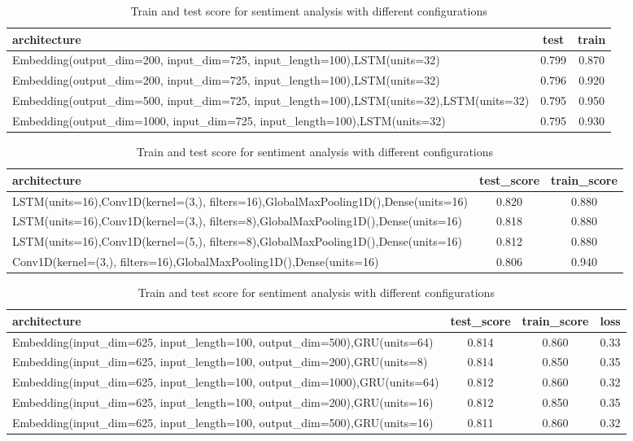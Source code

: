 \documentclass[10pt]{SelfArx} %
\begin{document}
	\begin{table}[]
		\begin{tabular*}{1\linewidth}{@{\extracolsep{\fill} }lcc@{}}
			\toprule
			architecture & test & train \\ \midrule
			Embedding(output\_dim=200, input\_dim=725, input\_length=100),LSTM(units=32) & 0.799 & 0.870 \\
			Embedding(output\_dim=200, input\_dim=725, input\_length=100),LSTM(units=32) & 0.796 & 0.920 \\
			Embedding(output\_dim=500, input\_dim=725, input\_length=100),LSTM(units=32),LSTM(units=32) & 0.795 & 0.950 \\
			Embedding(output\_dim=1000, input\_dim=725, input\_length=100),LSTM(units=32) & 0.795 & 0.930 \\ \bottomrule
		\end{tabular*}
		\caption{Train and test score for sentiment analysis with different configurations}
		\label{tsentiment2}
	\end{table}
	\begin{table}
		\begin{tabular*}{1\linewidth}{@{\extracolsep{\fill} }lcc@{}}
			\toprule
			architecture & test\_score & train\_score \\ \midrule
			LSTM(units=16),Conv1D(kernel=(3,), filters=16),GlobalMaxPooling1D(),Dense(units=16) & 0.820 & 0.880 \\
			LSTM(units=16),Conv1D(kernel=(3,), filters=8),GlobalMaxPooling1D(),Dense(units=16) & 0.818 & 0.880 \\
			LSTM(units=16),Conv1D(kernel=(5,), filters=8),GlobalMaxPooling1D(),Dense(units=16) & 0.812 & 0.880 \\
			Conv1D(kernel=(3,), filters=16),GlobalMaxPooling1D(),Dense(units=16) & 0.806 & 0.940 \\ \bottomrule
		\end{tabular*}
		\caption{Train and test score for sentiment analysis with different configurations}
		\label{tsentiment3}
	\end{table}
	\begin{table}[]
		\begin{tabular*}{1\linewidth}{@{\extracolsep{\fill} }lccc@{}}
			\toprule
			architecture & test\_score & train\_score & loss \\ \midrule
			Embedding(input\_dim=625, input\_length=100, output\_dim=500),GRU(units=64) & 0.814 & 0.860 & 0.33 \\
			Embedding(input\_dim=625, input\_length=100, output\_dim=200),GRU(units=8) & 0.814 & 0.850 & 0.35 \\
			Embedding(input\_dim=625, input\_length=100, output\_dim=1000),GRU(units=64) & 0.812 & 0.860 & 0.32 \\
			Embedding(input\_dim=625, input\_length=100, output\_dim=200),GRU(units=16) & 0.812 & 0.850 & 0.35 \\
			Embedding(input\_dim=625, input\_length=100, output\_dim=500),GRU(units=16) & 0.811 & 0.860 & 0.32 \\ \bottomrule
		\end{tabular*}
		\caption{Train and test score for sentiment analysis with different configurations}
		\label{tsentiment4}
	\end{table}
\end{document}

